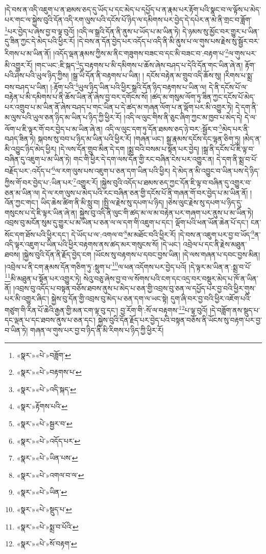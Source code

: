 །དེ་བས་ན་འདི་འཇུག་པ་ན་ཐམས་ཅད་དུ་ཡོད་པ་དང་མེད་པ་དཔྱོད་པ་ན་རྣམ་པར་རྟོག་པའི་སྣང་བ་ལ་ལྟོས་པ་མེད་པར་གང་ལ་སྐྱེས་བུའི་དོན་འདི་རག་ལུས་པའི་དངོས་པོ་ཉིད་ལ་དམིགས་པར་བྱེད་དེ་དཔེར་ན་མེ་ནི་གྲང་བ་ཟློག་\footnote{«སྣར་»«པེ་»བཟློག་}པར་བྱེད་པ་ཞེས་བྱ་བ་ལྟ་བུའོ། །འདི་ལ་སྒྲའི་དོན་ནི་ནུས་པ་ཡོད་པ་མ་ཡིན་ཏེ། དེ་ཉམས་སུ་མྱོང་བར་གྱུར་པ་ཡིན་དུ་ཟིན་ཀྱང་དེ་མེད་པའི་ཕྱིར་རོ། །དེ་བས་ན་དོན་བྱེད་པར་འདོད་པ་འདི་ནི་མི་ནུས་པ་ལ་གུས་པས་རྗེས་སུ་སྦྱོར་བར་རིགས་པ་མ་ཡིན་ནོ། །འདོད་ལྡན་རྣམས་ཀྱིས་མ་ནིང་གཟུགས་བཟང་བ་དང་མི་བཟང་བ་:བརྟག་པ་\footnote{«སྣར་»«པེ་»བརྟགས་པ་}ལ་གུས་པར་མི་འགྱུར་རོ། །གང་ཡང་:ཇི་སྐད་\footnote{«སྣར་»«པེ་»འདི་སྐད་}དུ་བརྟགས་པ་མི་དམིགས་པ་ཆོས་ཞེས་བཤད་པ་དེའི་དོན་གང་ཡིན་ཞེ་ན། རྟོག་པའི་ཤེས་པའི་ཡུལ་ཉིད་ཀྱིས། །སྒྲ་ཡི་དོན་ནི་བརྟགས་པ་ཡིན། །
དངོས་བརྟེན་མ་གྲུབ་འདི་ཆོས་སུ། །རིགས་པ་སྨྲ་བས་བཤད་པ་ཡིན། །:རྟོག་པའི་\footnote{«སྣར་»རྟོགས་པའི་}ཡུལ་ཉིད་ཡིན་པའི་ཕྱིར་སྒྲའི་དོན་ཉིད་བརྟགས་པ་ཡིན་ལ། དེ་ནི་དངོས་པོ་ལ་བརྟེན་པ་མི་དམིགས་པ་ནི་ཆོས་ཡིན་ནོ་ཞེས་བྱ་བར་དགོངས་སོ། །ཚད་མ་གསུམ་ལོག་ཏུ་ཟིན་ཀྱང་དངོས་པོ་མེད་པར་འགྲུབ་པ་མ་ཡིན་ནོ་ཞེས་བཤད་པ་གང་ཡིན་པ་དེ་ཚད་མ་གཞན་ལོག་པ་ན་ལྡོག་པར་མི་འགྱུར་ཏེ། དེ་དག་ནི་མ་ལུས་པའི་ཡུལ་ཅན་ཉིད་མ་ཡིན་པ་ཉིད་ཀྱི་ཕྱིར་རོ། །འདི་ལ་ལུང་གིས་ནི་ཅུང་ཞིག་ཀྱང་མ་ཁྱབ་པ་མེད་དེ། དེ་ལ་ལོག་པ་ཇི་ལྟར་གོ་བར་བྱེད་པ་མ་ཡིན་ཞེ་ན། འདི་ལ་ལུང་དག་ཏུ་དོན་ཐམས་ཅད་ཉེ་བར་:སྦྱོར་བ་\footnote{«སྣར་»«པེ་»སྦྱར་བ་}མེད་པར་ནི་བཤད་ཟིན་ཏེ། སྐབས་སུ་བབ་པ་ཉིད་མ་ཡིན་པའི་ཕྱིར་རོ། །གཞན་ཡང་། སྒྲ་རྣམས་དངོས་དང་ལྷན་ཅིག་ཏུ། །མེད་ན་མི་འབྱུང་ཉིད་མེད་ཕྱིར། །དེ་ལས་དོན་གྲུབ་མིན་དེ་དག །སྨྲ་བའི་བསམ་པ་སྟོན་པར་བྱེད། །སྒྲ་ནི་དངོས་པོ་ཇི་ལྟ་བ་བཞིན་དུ་འཇུག་པ་མ་ཡིན་ཏེ། གང་གི་ཕྱིར་དེ་དག་ལས་དོན་གྱི་རང་བཞིན་ངེས་པར་འགྱུར་ན། དེ་དག་ནི་སྨྲ་བ་པོ་བརྗོད་པར་:འདོད་པ་\footnote{«སྣར་»«པེ་»འདོད་པར་}ལ་རག་ལུས་པས་འཇུག་པ་ཅན་དག་ཡིན་པའི་ཕྱིར། དེ་མེད་ན་མི་འབྱུང་བ་ཡིན་པས་དེ་ཉིད་ཀྱིས་གོ་བར་བྱེད་པ་:ཡིན་པར་\footnote{«སྣར་»«པེ་»ཡིན་པས་}འགྱུར་རོ། །སྐྱེས་བུའི་འདོད་པ་ཐམས་ཅད་ཀྱང་དོན་ཇི་ལྟ་བ་བཞིན་དུ་འགྱུར་བ་ཅན་མ་ཡིན་ལ། དེ་ལ་རག་ལུས་པ་མེད་པའི་རང་བཞིན་ཅན་གྱི་དངོས་པོ་ནི་གཞན་གོ་བར་བྱེད་པ་མ་ཡིན་ནོ། །འོན་ཀྱང་གང་། ཡིད་ཆེས་ཚིག་ནི་མི་སླུ་བ། །སྤྱི་ལ་རྗེས་སུ་དཔག་པ་ཉིད། །ཅེས་ལུང་རྗེས་སུ་དཔག་པ་ཉིད་དུ་གསུངས་པ་དེ་ཇི་ལྟར་ཡིན་ཞེ་ན། སྐྱེས་བུ་འདི་ནི་ལུང་གི་ཚད་མ་ལ་མ་བརྟེན་པར་གཞག་པར་ནུས་པ་མ་ཡིན་ཏེ། འབྲས་བུ་མངོན་སུམ་དུ་གྱུར་པ་མ་ཡིན་པ་ཅན་ལ་ལ་དག་གི་འཇུག་པ་དང་། ལྡོག་པའི་ཕན་ཡོན་ཆེན་པོ་དང་། ངན་སོང་དག་ཐོས་པའི་ཕྱིར་དང་། དེ་ཡོད་པ་ལ་:འགལ་བ་\footnote{«སྣར་»«པེ་»འགལ་བ་ལ་}མ་མཐོང་བའི་ཕྱིར་རོ། །དེ་བས་ན་འཇུག་པར་བྱ་བ་ཡོད་\footnote{«སྣར་»«པེ་»ཡིན་}ན་འདི་ལྟར་འཇུག་པ་ཡིན་པའི་ཕྱིར་བརྟགས་ནས་ཚད་མར་གསུངས་སོ། །དེ་ཡང་། འབྲེལ་པ་དང་ནི་རྗེས་མཐུན་ཐབས། །སྐྱེས་བུའི་དོན་ནི་རྗོད་བྱེད་ངག །ཡོངས་སུ་བརྟགས་པ་དབང་བྱས་ཡིན། །དེ་ལས་གཞན་པ་དབང་བྱས་མིན། །འབྲེལ་པ་ནི་ངག་རྣམས་དོན་གཅིག་ཏུ་:སྡུག་པ་\footnote{«སྣར་»«པེ་»སྡུད་པ་}ལ་ཕན་འདོགས་པར་བྱེད་པའོ། །དེ་ལྟར་མ་ཡིན་ན་:སྨྲ་བ་པོ་\footnote{«སྣར་»«པེ་»སྨྲ་བ་པོའི་}མི་མཐུན་པ་སྟོན་པར་འགྱུར་ཏེ། སེའུ་བཅུ་ཞེས་བྱ་བ་ལ་སོགས་པའི་ངག་དང་འདྲ་བར་བསྡུར་མེད་པ་ཁོ་ན་ཡིན་ནོ། །འབྲས་བུ་འདོད་པ་བསྟན་བཅོས་ཐབས་ནུས་པ་མེད་པ་ཅན་གྱི་འབྲས་བུ་ཅན་ལ་དཔྱོད་པར་བྱ་བའི་ཕྱིར་གུས་པར་མི་འགྱུར་ཞིང་། སྐྱེས་བུ་དོན་གྱི་འབྲས་བུ་མེད་པ་ཅན་དག་ལ་ཡང་སྟེ། དུག་ཞི་བར་བྱ་བའི་ཕྱིར་འཇོག་པའི་གཙུག་གི་རིན་པོ་ཆེའི་རྒྱན་གྱི་མན་ངག་ལྟ་བུ་དང་། བྱ་རོག་གི་:སོ་ལ་བརྟགས་\footnote{«སྣར་»«པེ་»སོ་བརྟག་}པ་ལྟ་བུའོ། །དེ་བཟློག་ནས་སྡུད་པ་དང་ལྡན་པ་དང་ཐབས་ནུས་པ་ཅན་དང་། སྐྱེས་བུའི་དོན་རྗོད་པར་བྱེད་པའི་བསྟན་བཅོས་ནི་ཡོངས་སུ་བརྟག་པར་བྱ་བ་ཡིན་ཏེ། གཞན་ལ་གུས་པར་བྱ་བ་ཉིད་ནི་མི་རིགས་པ་ཉིད་ཀྱི་ཕྱིར་རོ། 